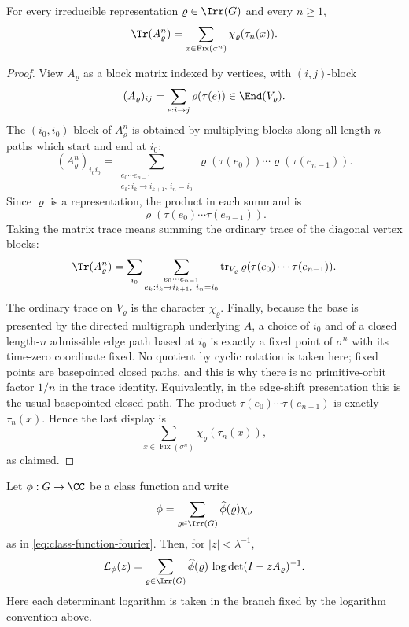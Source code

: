 \begin{lemma}
  \label{lem:twisted-trace-identity}
  For every irreducible representation \(\varrho\in\Irr(G)\) and every
  \(n\ge 1\),
  \[
    \Tr(A_\varrho^n)
    =
    \sum_{x\in\operatorname{Fix}(\sigma^n)}
      \chi_\varrho(\tau_n(x)).
  \]
\end{lemma}

\begin{proof}
  View \(A_\varrho\) as a block matrix indexed by vertices, with
  \((i,j)\)-block
  \[
    (A_\varrho)_{ij}=\sum_{e:i\to j}\varrho(\tau(e))
    \in\End(V_\varrho).
  \]
  The \((i_0,i_0)\)-block of \(A_\varrho^n\) is obtained by multiplying
  blocks along all length-\(n\) paths which start and end at \(i_0\):
  \[
    (A_\varrho^n)_{i_0i_0}
    =
    \sum_{\substack{e_0\cdots e_{n-1}\\
          e_k:i_k\to i_{k+1},\ i_n=i_0}}
      \varrho(\tau(e_0))\cdots\varrho(\tau(e_{n-1})).
  \]
  Since \(\varrho\) is a representation, the product in each summand is
  \[
    \varrho(\tau(e_0)\cdots\tau(e_{n-1})).
  \]
  Taking the matrix trace means summing the ordinary trace of the
  diagonal vertex blocks:
  \[
    \Tr(A_\varrho^n)
    =
    \sum_{i_0}
    \sum_{\substack{e_0\cdots e_{n-1}\\
          e_k:i_k\to i_{k+1},\ i_n=i_0}}
      \operatorname{tr}_{V_\varrho}
      \varrho(\tau(e_0)\cdots\tau(e_{n-1})).
  \]
  The ordinary trace on \(V_\varrho\) is the character
  \(\chi_\varrho\). Finally, because the base is presented by the
  directed multigraph underlying \(A\), a choice of \(i_0\) and of a closed
  length-\(n\) admissible edge path based at \(i_0\) is exactly a
  fixed point of \(\sigma^n\) with its time-zero coordinate fixed. No
  quotient by cyclic rotation is taken here; fixed points are
  basepointed closed paths, and this is why there is no primitive-orbit
  factor \(1/n\) in the trace identity. Equivalently, in the edge-shift
  presentation this is the usual basepointed closed path. The product
  \(\tau(e_0)\cdots\tau(e_{n-1})\) is exactly \(\tau_n(x)\). Hence the
  last display is
  \[
    \sum_{x\in\operatorname{Fix}(\sigma^n)}
      \chi_\varrho(\tau_n(x)),
  \]
  as claimed.
\end{proof}

\begin{theorem}
  \label{thm:class-function-linearisation}
  Let \(\phi:G\to\CC\) be a class function and write
  \[
    \phi=\sum_{\varrho\in\Irr(G)}\widehat\phi(\varrho)\chi_\varrho
  \]
  as in \eqref{eq:class-function-fourier}. Then, for \(|z|<\lambda^{-1}\),
  \begin{equation}\label{eq:class-logarithm-determinant-linearisation}
    \mathcal L_\phi(z)
    =
    \sum_{\varrho\in\Irr(G)}
      \widehat\phi(\varrho)\,
      \log\det(I-zA_\varrho)^{-1}.
  \end{equation}
  Here each determinant logarithm is taken in the branch fixed by the
  logarithm convention above.
\end{theorem}

